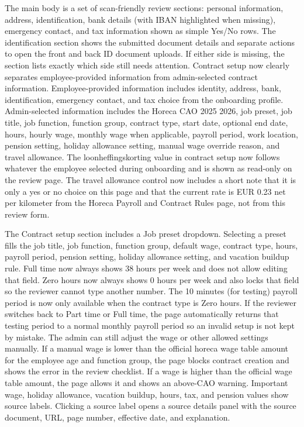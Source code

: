 \documentclass[11pt]{article}
\begin{document}
The main body is a set of scan-friendly review sections: personal information, address, identification, bank details (with IBAN highlighted when missing), emergency contact, and tax information shown as simple Yes/No rows. The identification section shows the submitted document details and separate actions to open the front and back ID document uploads. If either side is missing, the section lists exactly which side still needs attention. Contract setup now clearly separates employee-provided information from admin-selected contract information. Employee-provided information includes identity, address, bank, identification, emergency contact, and tax choice from the onboarding profile. Admin-selected information includes the Horeca CAO 2025 2026, job preset, job title, job function, function group, contract type, start date, optional end date, hours, hourly wage, monthly wage when applicable, payroll period, work location, pension setting, holiday allowance setting, manual wage override reason, and travel allowance. The loonheffingskorting value in contract setup now follows whatever the employee selected during onboarding and is shown as read-only on the review page. The travel allowance control now includes a short note that it is only a yes or no choice on this page and that the current rate is EUR 0.23 net per kilometer from the Horeca Payroll and Contract Rules page, not from this review form.

The Contract setup section includes a Job preset dropdown. Selecting a preset fills the job title, job function, function group, default wage, contract type, hours, payroll period, pension setting, holiday allowance setting, and vacation buildup rule. Full time now always shows 38 hours per week and does not allow editing that field. Zero hours now always shows 0 hours per week and also locks that field so the reviewer cannot type another number. The 10 minutes (for testing) payroll period is now only available when the contract type is Zero hours. If the reviewer switches back to Part time or Full time, the page automatically returns that testing period to a normal monthly payroll period so an invalid setup is not kept by mistake. The admin can still adjust the wage or other allowed settings manually. If a manual wage is lower than the official horeca wage table amount for the employee age and function group, the page blocks contract creation and shows the error in the review checklist. If a wage is higher than the official wage table amount, the page allows it and shows an above-CAO warning. Important wage, holiday allowance, vacation buildup, hours, tax, and pension values show source labels. Clicking a source label opens a source details panel with the source document, URL, page number, effective date, and explanation.
\end{document}
